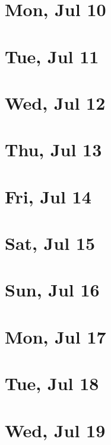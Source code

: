 	\section{Mon, Jul 10}
		
		
	\section{Tue, Jul 11}
		
		
	\section{Wed, Jul 12}
		
		
	\section{Thu, Jul 13}
		
		
	\section{Fri, Jul 14}
		
		
	\section{Sat, Jul 15}
		
		
	\section{Sun, Jul 16}
		
		
	\section{Mon, Jul 17}
		
		
	\section{Tue, Jul 18}
		
		
	\section{Wed, Jul 19}
		
		
